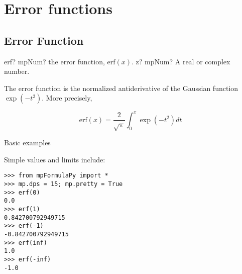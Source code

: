 %
%
%
%
%
%
%
%
%
%
%
%


\section{Error functions}


\subsection{Error Function}

\begin{mpFunctionsExtract}
	\mpFunctionOne
	{erf? mpNum? the error function, $\text{erf}(x)$.}
	{z? mpNum? A real or complex number.}
\end{mpFunctionsExtract}

\vpara
The error function is the normalized antiderivative of the Gaussian function $\exp(-t^2)$. More precisely,

\begin{equation}
\text{erf}(x) = \frac{2}{\sqrt{\pi}} \int_0^x \exp(-t^2)dt
\end{equation}

Basic examples

Simple values and limits include:

\begin{lstlisting}
>>> from mpFormulaPy import *
>>> mp.dps = 15; mp.pretty = True
>>> erf(0)
0.0
>>> erf(1)
0.842700792949715
>>> erf(-1)
-0.842700792949715
>>> erf(inf)
1.0
>>> erf(-inf)
-1.0
\end{lstlisting}

